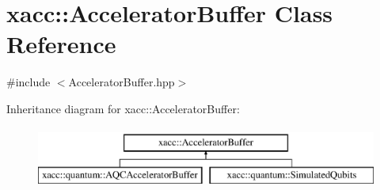 \hypertarget{a00019}{}\section{xacc\+:\+:Accelerator\+Buffer Class Reference}
\label{a00019}


{\ttfamily \#include $<$Accelerator\+Buffer.\+hpp$>$}

Inheritance diagram for xacc\+:\+:Accelerator\+Buffer\+:\begin{figure}[H]
\begin{center}
\leavevmode
\includegraphics[height=2.000000cm]{a00019}
\end{center}
\end{figure}
